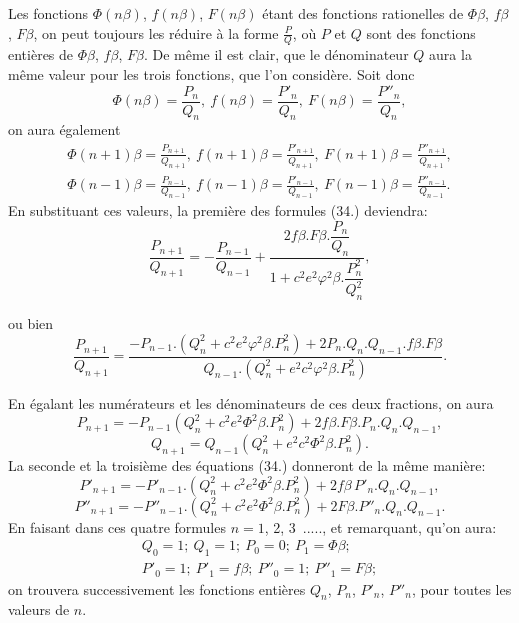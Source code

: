 \documentclass{article}
\begin{document}
Les fonctions $\Phi(n\beta)$, $f(n\beta)$, $F(n\beta)$ étant des fonctions rationelles de $\Phi\beta$, $f\beta$, $F\beta$, on peut toujours les réduire à la forme $\frac{P}{Q}$, où $P$ et $Q$ sont des fonctions entières de $\Phi\beta$, $f\beta$, $F\beta$. De même il est clair, que le dénominateur $Q$ aura la même valeur pour les trois fonctions, que l'on considère. Soit donc
\[ \Phi(n\beta)=\frac{P_n}{Q_n},\ f(n\beta)=\frac{P'_n}{Q_n},\ F(n\beta)=\frac{P''_n}{Q_n}, \tag{35$'$.} \]
on aura également
\[ \begin{gathered} \Phi(n+1)\beta=\frac{P_{n+1}}{Q_{n+1}},\ f(n+1)\beta=\frac{P'_{n+1}}{Q_{n+1}},\ F(n+1)\beta=\frac{P''_{n+1}}{Q_{n+1}},\\ \Phi(n-1)\beta=\frac{P_{n-1}}{Q_{n-1}},\ f(n-1)\beta=\frac{P'_{n-1}}{Q_{n-1}},\ F(n-1)\beta=\frac{P''_{n-1}}{Q_{n-1}}. \end{gathered} \]
En substituant ces valeurs, la première des formules (34.) deviendra:
\[ \frac{P_{n+1}}{Q_{n+1}}=-\frac{P_{n-1}}{Q_{n-1}}+\frac{2f\beta.F\beta.\dfrac{P_n}{Q_n}}{1+c^{2}e^{2}\varphi^{2}\beta.\dfrac{P_n^{2}}{Q_n^{2}}}, \]

ou bien
\[ \frac{P_{n+1}}{Q_{n+1}}=\frac{-P_{n-1}.(Q_n^{2}+c^{2}e^{2}\varphi^{2}\beta.P_n^{2})+2P_n.Q_n.Q_{n-1}.f\beta.F\beta}{Q_{n-1}.(Q_n^{2}+e^{2}c^{2}\varphi^{2}\beta.P_n^{2})}. \]

En égalant les numérateurs et les dénominateurs de ces deux fractions, on aura
\[ P_{n+1}=-P_{n-1}(Q_n^{2}+c^{2}e^{2}\Phi^{2}\beta.P_n^{2})+2f\beta.F\beta.P_n.Q_n.Q_{n-1}, \tag{36.} \]
\[ Q_{n+1}=Q_{n-1}(Q_n^{2}+e^{2}c^{2}\Phi^{2}\beta.P_n^{2}). \tag{37.} \]
La seconde et la troisième des équations (34.) donneront de la même manière:
\[ P'_{n+1}=-P'_{n-1}.(Q_n^{2}+c^{2}e^{2}\Phi^{2}\beta.P_n^{2})+2f\beta\,P'_n.Q_n.Q_{n-1}, \tag{38.} \]
\[ P''_{n+1}=-P''_{n-1}.(Q_n^{2}+c^{2}e^{2}\Phi^{2}\beta.P_n^{2})+2F\beta.P''_n.Q_n.Q_{n-1}. \tag{39.} \]
En faisant dans ces quatre formules $n=1$, 2, 3\ ....., et remarquant, qu'on aura:
\[ \begin{gathered} Q_0=1;\ Q_1=1;\ P_0=0;\ P_1=\Phi\beta;\\ P'_0=1;\ P'_1=f\beta;\ P''_0=1;\ P''_1=F\beta; \end{gathered} \]
on trouvera successivement les fonctions entières $Q_n$, $P_n$, $P'_n$, $P''_n$, pour toutes les valeurs de $n$.
\end{document}
